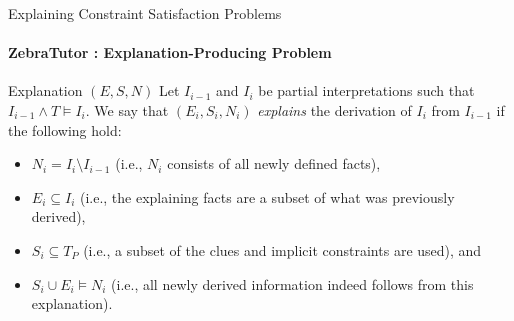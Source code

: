 \documentclass{beamer}
\newcommand\m[1]{\ensuremath{#1}\xspace}
\newcommand\allconstraints{\m{T_P}}
\begin{document}






\begin{frame}{\small{Explaining Constraint Satisfaction Problems}}
    \framesubtitle{ZebraTutor : Explanation-Producing Problem}
    \begin{block}{Explanation $(E,S,N)$}
        Let $I_{i-1}$ and $I_i$ be partial interpretations such that $I_{i-1}\wedge T \models I_i$.
        We say that $(E_i,S_i,N_i)$ \emph{explains} the derivation of $I_{i}$ from $I_{i-1}$ if the following hold:
        \begin{itemize}
            \item $N_i= I_i \setminus I_{i-1}$ (i.e., $N_i$ consists of all newly defined facts),
            \item $E_i\subseteq I_i$ (i.e., the explaining facts are a subset of what was previously derived),
            \item $S_i \subseteq T_P$ (i.e., a subset of the clues and implicit constraints are used), and
            \item $S_i \cup E_i \models N_i$ (i.e., all newly derived information indeed follows from this explanation).
        \end{itemize}
    \end{block}
\end{frame}
\end{document}
